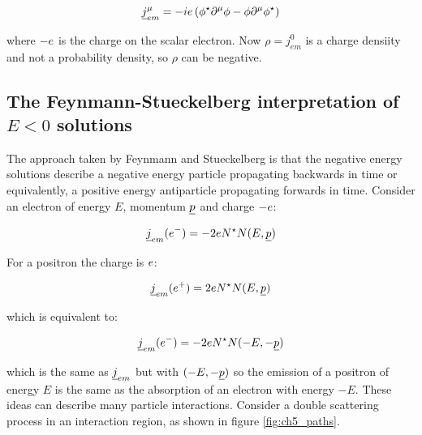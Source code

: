 \[
  \underline{j}^{\mu}_{em} = -ie\left(\phi^{\star}\partial^{\mu}\phi - \phi\partial^{\mu}\phi^{\star} \right)
\]

where $-e$ is the charge on the scalar electron.  Now $\rho = j^0_{em}$ is a charge densiity and not a probability density, so $\rho$ can be negative.

\subsection{The Feynmann-Stueckelberg interpretation of \texorpdfstring{$E<0$}{ELO0} solutions}

The approach taken by Feynmann and Stueckelberg is that the negative energy solutions describe a negative energy particle propagating backwards in time or equivalently, a positive energy antiparticle propagating forwards in time.  Consider an electron of energy $E$, momentum $\underline{p}$ and charge $-e$:

\[
  \underline{j}_{em}(e^-) = -2eN^{\star}N(E,\underline{p})
\]

For a positron the charge is $e$:

\[
  \underline{j}_{em}(e^+) = 2e N^{\star}N(E,\underline{p})
\]

which is equivalent to:

\[
  \underline{j}_{em}(e^-) = -2e N^{\star}N(-E,-\underline{p})
\]

which is the same as $\underline{j}_{em}$ but with $(-E,-\underline{p})$ so the emission of a positron of energy $E$ is the same as the absorption of an electron with energy $-E$.  These ideas can describe many particle interactions.  Consider a double scattering process in an interaction region, as shown in figure \ref{fig:ch5_paths}.

